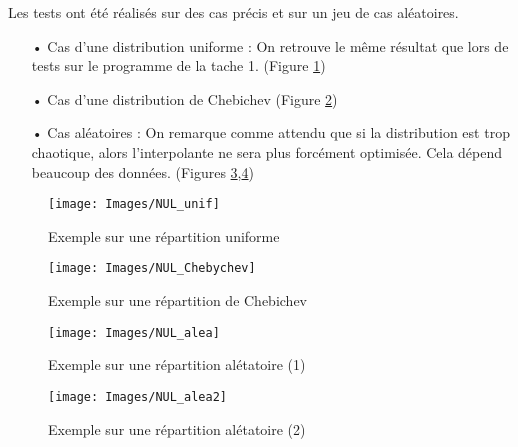 \documentclass[a4paper,12pt]{article} %
\begin{document}
    			Les tests ont été réalisés sur des cas précis et sur un jeu de cas aléatoires.
    
                \begin{itemize}
                \item[•] Cas d'une distribution uniforme : On retrouve le même résultat que lors de tests sur le programme de la tache 1. (Figure \ref{NUL1})
                \item[•] Cas d'une distribution de Chebichev (Figure \ref{NUL2})
                \item[•] Cas aléatoires : On remarque comme attendu que si la distribution est trop chaotique, alors l'interpolante ne sera plus forcément optimisée. Cela dépend beaucoup des données. (Figures \ref{NUL3},\ref{NUL4})
                \end{itemize}
                
                \begin{figure}
                \begin{center}
                \texttt{[image: Images/NUL\_unif]} 
                \end{center}
                \caption{Exemple sur une répartition uniforme}
                \label{NUL1}
                \end{figure}
                
                \begin{figure}
                \begin{center}
                \texttt{[image: Images/NUL\_Chebychev]} 
                \end{center}
                \caption{Exemple sur une répartition de Chebichev}
                \label{NUL2}
                \end{figure}
                
                \begin{figure}
                \begin{center}
                \texttt{[image: Images/NUL\_alea]} 
                \end{center}
                \caption{Exemple sur une répartition alétatoire (1)}
                \label{NUL3}
                \end{figure}
                
                
                \begin{figure}
                \begin{center}
                \texttt{[image: Images/NUL\_alea2]} 
                \end{center}
                \caption{Exemple sur une répartition alétatoire (2)}
                \label{NUL4}
                \end{figure}
                
\end{document}
